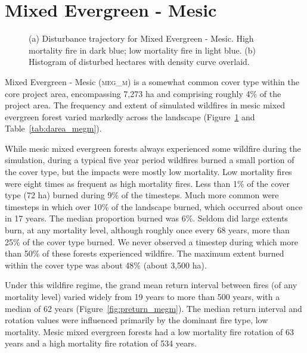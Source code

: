 \section{Mixed Evergreen - Mesic} 

\begin{figure}[!htbp]
  \centering
  \caption{(a) \small Disturbance trajectory for Mixed Evergreen - Mesic. High mortality fire in dark blue; low mortality fire in light blue. (b) Histogram of disturbed hectares with density curve overlaid.} 
  \label{fig:darea_megm}
\end{figure}

Mixed Evergreen - Mesic (\textsc{meg\_m}) is a somewhat common cover type within the core project area, encompassing 7,273 ha and comprising roughly 4\% of the project area. The frequency and extent of simulated wildfires in mesic mixed evergreen forest varied markedly across the landscape (Figure~\ref{fig:darea_megm} and Table~\ref{tab:darea_megm}). 

While mesic mixed evergreen forests always experienced some wildfire during the simulation, during a typical five year period wildfires burned a small portion of the cover type, but the impacts were mostly low mortality. Low mortality fires were eight times as frequent as high mortality fires. Less than 1\% of the cover type (72 ha) burned during 9\% of the timesteps. Much more common were timesteps in which over 10\% of the landscape burned, which occurred about once in 17 years. The median proportion burned was 6\%. Seldom did large extents burn, at any mortality level, although roughly once every 68 years, more than 25\% of the cover type burned. We never observed a timestep during which more than 50\% of these forests experienced wildfire. The maximum extent burned within the cover type was about 48\% (about 3,500 ha).

Under this wildfire regime, the grand mean return interval between fires (of any mortality level) varied widely from 19 years to more than 500 years, with a median of 62 years (Figure~\ref{fig:preturn_megm}). The median return interval and rotation values were influenced primarily by the dominant fire type, low mortality. Mesic mixed evergreen forests had a low mortality fire rotation of 63 years and a high mortality fire rotation of 534 years. 

